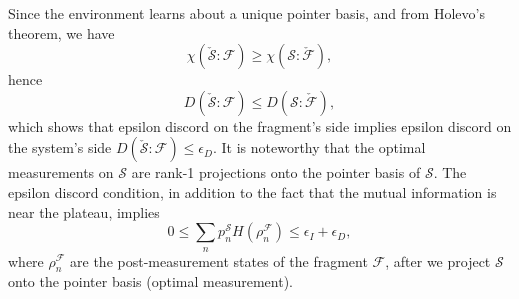 \documentclass[a4paper,11pt,accepted=2024-09-14]{quantumarticle}
\newcommand{\+}         {\dagger}
\newcommand{\mc}[1]{\mathcal{#1}}
\begin{document}
{Since the environment learns about a unique pointer basis}, and from Holevo's theorem, we have
\begin{equation}
\chi(\check{\mc{S}}:\mc{F})\geq \chi(\mc{S}:\check{\mc{F}}),
\end{equation}
hence
\begin{equation}
D(\check{\mc{S}}:\mc{F})\leq D(\mc{S}:\check{\mc{F}}),
\end{equation}
which shows that epsilon discord on the fragment's side implies epsilon discord on the system's side $D(\check{\mc{S}}:\mc{F})\leq \epsilon_{D}$. It is noteworthy that the optimal measurements on $\mc{S}$ are rank-1 projections onto the pointer basis of $\mc{S}$. The epsilon discord condition, in addition to the fact that the mutual information is near the plateau, implies
\begin{equation}
 0 \leq \sum_{n}p^{\mc{S}}_n H(\rho^{\mc{F}}_n) \leq \epsilon_{I}+ \epsilon_{D},
\end{equation}
where $\rho^{\mc{F}}_n$ are the post-measurement states of the fragment $\mc{F}$, after we project $\mc{S}$ onto the pointer basis (optimal measurement).
\end{document}
